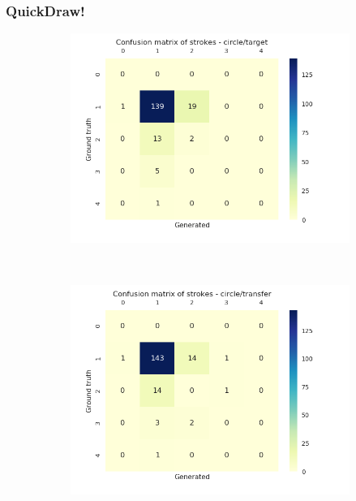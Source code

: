     \subsubsection{QuickDraw!}
      \begin{figure}
        \centering
        \begin{subfigure}[tb]{0.45\textwidth}
            \includegraphics[width=\textwidth]{images/sota/quickdraw_results/quickdraw_circle_target_strokes_heatmap.png}
        \end{subfigure}
        ~
        \begin{subfigure}[tb]{0.45\textwidth}
            \includegraphics[width=\textwidth]{images/sota/quickdraw_results/quickdraw_circle_transfer_strokes_heatmap.png}
        \end{subfigure}


\end{figure}
